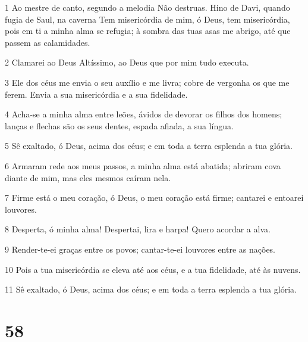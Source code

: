 \par 1 Ao mestre de canto, segundo a melodia Não destruas. Hino de Davi, quando fugia de Saul, na caverna Tem misericórdia de mim, ó Deus, tem misericórdia, pois em ti a minha alma se refugia; à sombra das tuas asas me abrigo, até que passem as calamidades.
\par 2 Clamarei ao Deus Altíssimo, ao Deus que por mim tudo executa.
\par 3 Ele dos céus me envia o seu auxílio e me livra; cobre de vergonha os que me ferem. Envia a sua misericórdia e a sua fidelidade.
\par 4 Acha-se a minha alma entre leões, ávidos de devorar os filhos dos homens; lanças e flechas são os seus dentes, espada afiada, a sua língua.
\par 5 Sê exaltado, ó Deus, acima dos céus; e em toda a terra esplenda a tua glória.
\par 6 Armaram rede aos meus passos, a minha alma está abatida; abriram cova diante de mim, mas eles mesmos caíram nela.
\par 7 Firme está o meu coração, ó Deus, o meu coração está firme; cantarei e entoarei louvores.
\par 8 Desperta, ó minha alma! Despertai, lira e harpa! Quero acordar a alva.
\par 9 Render-te-ei graças entre os povos; cantar-te-ei louvores entre as nações.
\par 10 Pois a tua misericórdia se eleva até aos céus, e a tua fidelidade, até às nuvens.
\par 11 Sê exaltado, ó Deus, acima dos céus; e em toda a terra esplenda a tua glória.

\chapter{58}

